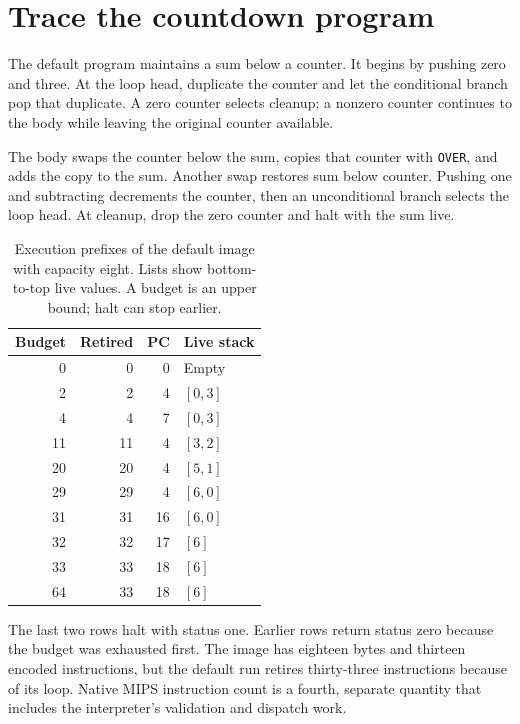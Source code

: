 \section{Trace the countdown program}\label{vm-countdown}
The default program maintains a sum below a counter. It begins by pushing zero and
three. At the loop head, duplicate the counter and let the conditional branch pop
that duplicate. A zero counter selects cleanup; a nonzero counter continues to the
body while leaving the original counter available.

The body swaps the counter below the sum, copies that counter with \texttt{OVER},
and adds the copy to the sum. Another swap restores sum below counter. Pushing one
and subtracting decrements the counter, then an unconditional branch selects the
loop head. At cleanup, drop the zero counter and halt with the sum live.

\begin{table}[htbp]
  \centering
  \caption{Execution prefixes of the default image with capacity eight. Lists show bottom-to-top live values. A budget is an upper bound; halt can stop earlier.}
  \begin{tabular}{rrrl}
    \toprule
    Budget & Retired & PC & Live stack \\
    \midrule
    0      & 0       & 0  & Empty      \\
    2      & 2       & 4  & $[0,3]$    \\
    4      & 4       & 7  & $[0,3]$    \\
    11     & 11      & 4  & $[3,2]$    \\
    20     & 20      & 4  & $[5,1]$    \\
    29     & 29      & 4  & $[6,0]$    \\
    31     & 31      & 16 & $[6,0]$    \\
    32     & 32      & 17 & $[6]$      \\
    33     & 33      & 18 & $[6]$      \\
    64     & 33      & 18 & $[6]$      \\
    \bottomrule
  \end{tabular}
\end{table}

The last two rows halt with status one. Earlier rows return status zero because the
budget was exhausted first. The image has eighteen bytes and thirteen encoded
instructions, but the default run retires thirty-three instructions because of its
loop. Native MIPS instruction count is a fourth, separate quantity that includes the
interpreter's validation and dispatch work.
